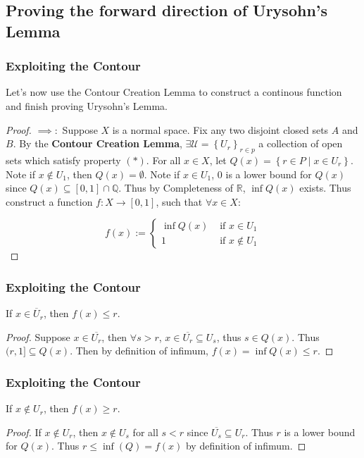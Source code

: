 \documentclass{beamer}
\newcommand*{\subeq}{\subseteq}
\newcommand*{\empset}{\emptyset}
\newcommand{\R}{\mathbb{R}}
\newcommand{\Q}{\mathbb{Q}}
\begin{document}
\subsection{Proving the forward direction of Urysohn's Lemma}
\begin{frame}
    \frametitle{Exploiting the Contour}
    Let's now use the Contour Creation Lemma to construct a continous function and finish proving Urysohn's Lemma.  
    \begin{proof}
        \renewcommand{\qedsymbol}{}

        $\implies: $ Suppose $X$ is a normal space. Fix any two disjoint closed sets $A$ and $B$. By the \textbf{Contour Creation Lemma}, $\exists \mathcal{U} = \left\{ U_r \right\}_{r \in p}$ a collection of open sets which satisfy property $(*)$. For all $x \in X$, let $Q(x) = \left\{ r \in P \mid x \in U_r \right\}$. Note if $x \not \in U_1$, then $Q(x) = \empset$. Note if $x \in U_1$, 0 is a lower bound for $Q(x)$ since $Q(x) \subeq [0, 1] \cap \Q$. Thus by Completeness of $\R$, $\inf Q(x)$ exists. Thus construct a function $f: X \to [0, 1]$, such that $\forall  x \in X$: 

        \begin{equation*}
            f(x) := \begin{cases}
                \inf Q(x) & \text{ if } x \in U_1 \\
                1 & \text{ if } x \not \in U_1 
            \end{cases}
        \end{equation*}
    \end{proof}

\end{frame}

\begin{frame}
    \frametitle{Exploiting the Contour}

    \begin{lemma}[Lemma A]
        If $x \in \overline U_r$, then $f(x) \leq r$.  
    \end{lemma}
    \begin{proof}
        Suppose $x \in \overline{U_r}$, then $\forall s > r$, $x \in \overline{U_r} \subeq U_s$, thus $s \in Q(x)$. Thus $(r, 1] \subeq Q(x)$. Then by definition of infimum, $f(x) = \inf Q(x) \leq r$.       
    \end{proof}

\end{frame}

\begin{frame}
    \frametitle{Exploiting the Contour}

    \begin{lemma}[Lemma B]
        If $x \not \in U_r$, then $f(x) \geq r$.  
    \end{lemma}
    \begin{proof}
        If $x \not \in U_r$, then $x \not \in U_s$ for all $s < r$ since $\overline{U_s} \subeq U_r$. Thus $r$ is a lower bound for $Q(x)$. Thus $r \leq \inf (Q) = f(x)$ by definition of infimum.             
    \end{proof}

\end{frame}
\end{document}
